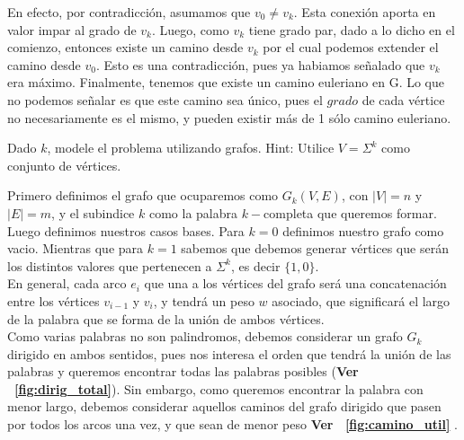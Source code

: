 \documentclass[letterpaper,10pt,table, dvipsnames]{article}
\newcommand{\figref}[1]{\figurename~\ref{#1}}
\begin{document}
En efecto, por contradicción, asumamos que $v_0 \neq v_k$. Esta conexión aporta en valor impar al grado de $v_k$. Luego, como $v_k$ tiene grado par, dado a lo dicho en el comienzo, entonces existe un camino desde $v_k$ por el cual podemos extender el camino desde $v_0$. Esto es una contradicción, pues ya habiamos señalado que $v_k$ era máximo. Finalmente, tenemos que existe un camino euleriano en G. Lo que no podemos señalar es que este camino sea único, pues el $grado$ de cada vértice no necesariamente es el mismo, y pueden existir más de 1 sólo camino euleriano.

\newpage

\begin{tcolorbox}
 Dado $k$, modele el problema utilizando grafos. Hint: Utilice $V = \Sigma^k$ como conjunto de vértices.
\end{tcolorbox}

Primero definimos el grafo que ocuparemos como $G_{k}(V,E)$, con $|V| = n$ y $|E| = m$, y el subindice $k$ como la palabra $k-$completa que queremos formar. Luego definimos nuestros casos bases. Para $k=0$ definimos nuestro grafo como vacio. Mientras que para $k=1$ sabemos que debemos generar vértices que serán los distintos valores que pertenecen a $\Sigma^k$, es decir $\{1,0\}$. \\

En general, cada arco $e_i$ que una a los vértices del grafo será una concatenación entre los vértices $v_{i-1} $ y $v_i $, y tendrá un peso $w$ asociado, que significará el largo de la palabra que se forma de la unión de ambos vértices. \\

Como varias palabras no son palindromos, debemos considerar un grafo $G_{k}$ dirigido en ambos sentidos, pues nos interesa el orden que tendrá la unión de las palabras y queremos encontrar todas las palabras posibles (\textbf{Ver \figref{fig:dirig_total}}). Sin embargo, como queremos encontrar la palabra con menor largo, debemos considerar aquellos caminos del grafo dirigido que pasen por todos los arcos una vez, y que sean de menor peso \textbf{Ver \figref{fig:camino_util} } .\\
\end{document}
